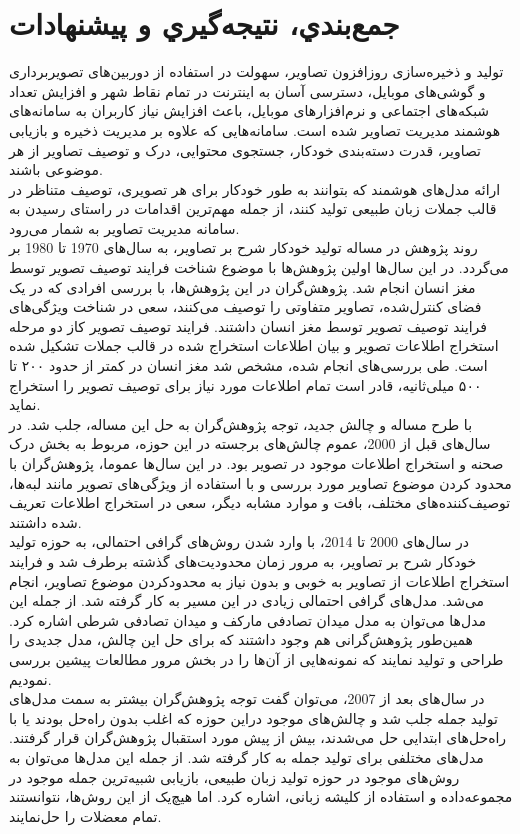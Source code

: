 \chapter{جمع‌بندي، نتيجه‌گيري و پیشنهادات}
تولید و ذخیره‌سازی روزافزون تصاویر، سهولت در استفاده از دوربین‌های تصویر‌برداری و گوشی‌های موبایل، دسترسی آسان به اینترنت در تمام نقاط شهر و افزایش تعداد شبکه‌های اجتماعی و نرم‌افزارهای موبایل، باعث افزایش نیاز کاربران به سامانه‌های هوشمند مدیریت تصاویر شده است. سامانه‌هایی که علاوه بر مدیریت ذخیره و بازیابی تصاویر، قدرت دسته‌بندی خودکار، جستجوی محتوایی، درک و توصیف تصاویر از هر موضوعی باشند.
\\
ارائه مدل‌های هوشمند که بتوانند به طور خودکار برای هر تصویری، توصیف متناظر در قالب جملات زبان طبیعی تولید کنند، از جمله مهم‌ترین اقدامات در راستای رسیدن به سامانه مدیریت تصاویر به شمار می‌رود. 
\\
روند پژوهش در مساله تولید خودکار شرح بر تصاویر، به سال‌های 1970 تا 1980 بر می‌گردد. در این سال‌ها اولین پژوهش‌ها با موضوع شناخت فرایند توصیف تصویر توسط مغز انسان انجام شد. پژوهش‌گران در این پژوهش‌ها، با بررسی افرادی که در یک فضای کنترل‌شده، تصاویر متفاوتی را توصیف می‌کنند، سعی در شناخت ویژگی‌های فرایند توصیف تصویر توسط مغز انسان داشتند. فرایند توصیف تصویر کاز دو مرحله استخراج اطلاعات تصویر و بیان اطلاعات استخراج شده در قالب جملات تشکیل شده است. طی بررسی‌های انجام شده، مشخص شد مغز انسان در کمتر از حدود ۲۰۰ تا ۵۰۰ میلی‌ثانیه، قادر است تمام اطلاعات مورد نیاز برای توصیف تصویر را استخراج نماید. 
\\
با طرح مساله و چالش جدید، توجه پژوهش‌گران به حل این مساله، جلب شد. در سال‌های قبل از 2000، عموم چالش‌های برجسته در این حوزه، مربوط به بخش درک صحنه و استخراج اطلاعات موجود در تصویر بود. در این سال‌ها عموما،‌ پژوهش‌گران با محدود کردن موضوع تصاویر مورد بررسی و با استفاده از ویژگی‌های تصویر مانند لبه‌ها،‌ توصیف‌کننده‌های مختلف، بافت و موارد مشابه دیگر، سعی در استخراج اطلاعات تعریف شده داشتند.
\\
در سال‌های 2000 تا 2014، با وارد شدن روش‌های گرافی احتمالی، به حوزه تولید خودکار شرح بر تصاویر، به مرور زمان محدودیت‌های گذشته برطرف شد و فرایند استخراج اطلاعات از تصاویر به خوبی و بدون نیاز به محدودکردن موضوع تصاویر، انجام می‌شد. مدل‌های گرافی احتمالی زیادی در این مسیر به کار گرفته شد. از جمله این مدل‌ها می‌توان به مدل میدان تصادفی مارکف و میدان تصادفی شرطی اشاره کرد. همین‌طور پژوهش‌گرانی هم وجود داشتند که برای حل این چالش، مدل جدیدی را طراحی و تولید نمایند که نمونه‌هایی از آن‌ها را در بخش مرور مطالعات پیشین بررسی نمودیم.
\\
در سال‌های بعد از 2007، می‌توان گفت توجه پژوهش‌گران بیشتر به سمت مدل‌های تولید جمله جلب شد و چالش‌های موجود دراین حوزه که اغلب بدون راه‌حل  بودند یا با راه‌حل‌های ابتدایی حل می‌شدند، بیش از پیش مورد استقبال پژوهش‌گران قرار گرفتند. مدل‌های مختلفی برای تولید جمله به کار گرفته شد. از جمله این مدل‌ها می‌توان به روش‌های موجود در حوزه تولید زبان طبیعی، بازیابی شبیه‌ترین جمله موجود در مجموعه‌داده و استفاده از کلیشه زبانی،‌ اشاره کرد. اما هیچ‌یک از این روش‌ها، نتوانستند تمام معضلات را حل‌نمایند.
